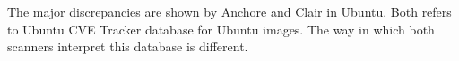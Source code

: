 \documentclass[a4paper,num-refs]{oup-contemporary}
\begin{document}
{The major discrepancies are shown by Anchore and Clair in Ubuntu. Both refers to Ubuntu CVE Tracker database for Ubuntu images.
The way in which both scanners interpret this database is different.
%
%
%
}
\end{document}
